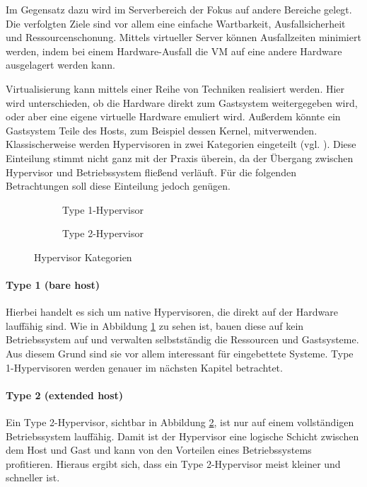 \documentclass[
  a4paper,					    %
  twoside,
  DIV=calc,     				%
  bibliography=totoc,
  cleardoublepage=empty,
  ngerman,     					%
  final       					%
]{scrbook}
\begin{document}
Im Gegensatz dazu wird im Serverbereich der Fokus auf andere Bereiche gelegt. Die verfolgten Ziele sind vor allem eine einfache Wartbarkeit, Ausfallsicherheit und Ressourcenschonung. Mittels virtueller Server können Ausfallzeiten minimiert werden, indem bei einem Hardware-Ausfall die VM auf eine andere Hardware ausgelagert werden kann.

Virtualisierung kann mittels einer Reihe von Techniken realisiert werden. Hier wird unterschieden, ob die Hardware direkt zum Gastsystem weitergegeben wird, oder aber eine eigene virtuelle Hardware emuliert wird. Außerdem könnte ein Gastsystem Teile des Hosts, zum Beispiel dessen Kernel, mitverwenden. Klassischerweise werden Hypervisoren in zwei Kategorien eingeteilt (vgl. \cite[Seite 22 ff.]{hypervisor}). Diese Einteilung stimmt nicht ganz mit der Praxis überein, da der Übergang zwischen Hypervisor und Betriebssystem fließend verläuft. Für die folgenden Betrachtungen soll diese Einteilung jedoch genügen.

\begin{figure}[tb]
    \centering
    \begin{subfigure}[b]{0.49\textwidth}
        \centering
        
        \caption{Type 1-Hypervisor}
        \label{fig:hypervisor_type1}
    \end{subfigure}
    \begin{subfigure}[b]{0.49\textwidth}
        \centering
        
        \caption{Type 2-Hypervisor}
        \label{fig:hypervisor_type2}
    \end{subfigure}
    \caption{Hypervisor Kategorien}
    \label{fig:hypervisor}
\end{figure}

\paragraph{Type 1 (bare host)} Hierbei handelt es sich um native Hypervisoren, die direkt auf der Hardware lauffähig sind. Wie in Abbildung \ref{fig:hypervisor_type1} zu sehen ist, bauen diese auf kein Betriebssystem auf und verwalten selbstständig die Ressourcen und Gastsysteme. Aus diesem Grund sind sie vor allem interessant für eingebettete Systeme. Type 1-Hypervisoren werden genauer im nächsten Kapitel betrachtet.

\paragraph{Type 2 (extended host)} Ein Type 2-Hypervisor, sichtbar in Abbildung \ref{fig:hypervisor_type2}, ist nur auf einem vollständigen Betriebssystem lauffähig. Damit ist der Hypervisor eine logische Schicht zwischen dem Host und Gast und kann von den Vorteilen eines Betriebssystems profitieren. Hieraus ergibt sich, dass ein Type 2-Hypervisor meist kleiner und schneller ist.
\end{document}
